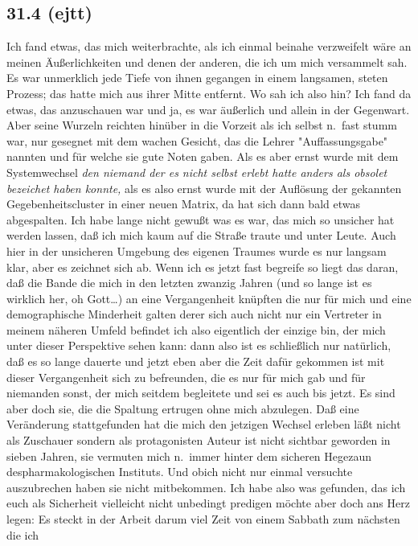 \documentclass[
]{article}
\author{}
\date{\vspace{-2.5em}}
\begin{document}
\subsection{31.4 (ejtt)}\label{ejtt}

Ich fand etwas, das mich weiterbrachte, als ich einmal beinahe
verzweifelt wäre an meinen Äußerlichkeiten und denen der anderen, die
ich um mich versammelt sah. Es war unmerklich jede Tiefe von ihnen
gegangen in einem langsamen, steten Prozess; das hatte mich aus ihrer
Mitte entfernt. Wo sah ich also hin? Ich fand da etwas, das anzuschauen
war und ja, es war äußerlich und allein in der Gegenwart. Aber seine
Wurzeln reichten hinüber in die Vorzeit als ich selbst n.~fast stumm
war, nur gesegnet mit dem wachen Gesicht, das die Lehrer
"Auffassungsgabe" nannten und für welche sie gute Noten gaben. Als es
aber ernst wurde mit dem Systemwechsel \emph{den niemand der es nicht
selbst erlebt hatte anders als obsolet bezeichet haben konnte, }als es
also ernst wurde mit der Auflösung der gekannten Gegebenheitscluster in
einer neuen Matrix, da hat sich dann bald etwas abgespalten. Ich habe
lange nicht gewußt was es war, das mich so unsicher hat werden lassen,
daß ich mich kaum auf die Straße traute und unter Leute. Auch hier in
der unsicheren Umgebung des eigenen Traumes wurde es nur langsam klar,
aber es zeichnet sich ab. Wenn ich es jetzt fast begreife so liegt das
daran, daß die Bande die mich in den letzten zwanzig Jahren (und so
lange ist es wirklich her, oh Gott\ldots) an eine Vergangenheit knüpften
die nur für mich und eine demographische Minderheit galten derer sich
auch nicht nur ein Vertreter in meinem näheren Umfeld befindet ich also
eigentlich der einzige bin, der mich unter dieser Perspektive sehen
kann: dann also ist es schließlich nur natürlich, daß es so lange
dauerte und jetzt eben aber die Zeit dafür gekommen ist mit dieser
Vergangenheit sich zu befreunden, die es nur für mich gab und für
niemanden sonst, der mich seitdem begleitete und sei es auch bis jetzt.
Es sind aber doch sie, die die Spaltung ertrugen ohne mich abzulegen.
Daß eine Veränderung stattgefunden hat die mich den jetzigen Wechsel
erleben läßt nicht als Zuschauer sondern als protagonisten Auteur ist
nicht sichtbar geworden in sieben Jahren, sie vermuten mich n.~immer
hinter dem sicheren Hegezaun despharmakologischen Instituts. Und obich
nicht nur einmal versuchte auszubrechen haben sie nicht mitbekommen. Ich
habe also was gefunden, das ich euch als Sicherheit vielleicht nicht
unbedingt predigen möchte aber doch ans Herz legen: Es steckt in der
Arbeit darum viel Zeit von einem Sabbath zum nächsten die ich
\end{document}
